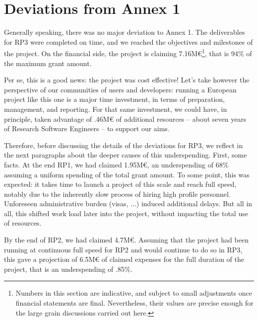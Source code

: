 \section{Deviations from Annex 1}
\label{section.deviations}

Generally speaking, there was no major deviation to Annex 1. The
deliverables for RP3 were completed on time, and we reached the
objectives and milestones of the project. On the financial side, the
project is claiming 7.16M€\footnote{Numbers in this section are
  indicative, and subject to small adjustments once financial
  statements are final. Nevertheless, their values are precise enough
  for the large grain discussions carried out here.}, that is 94\% of
the maximum grant amount.

Per se, this is a good news: the project was cost effective! Let's
take however the perspective of our communities of users and
developers: running a European project like this one is a major time
investment, in terms of preparation, management, and reporting. For
that same investment, we could have, in principle, taken advantage of
.46M€ of additional resources -- about seven years of Research
Software Engineers -- to support our aims.

Therefore, before discussing the details of the deviations for RP3, we
reflect in the next paragraphs about the deeper causes of this
underspending. First, some facts. At the end RP1, we had claimed
1.95M€, an underspending of 68\% assuming a uniform spending of the
total grant amount. To some point, this was expected: it takes time to
launch a project of this scale and reach full speed, notably due to
the inherently slow process of hiring high profile personnel.
Unforeseen administrative burden (visas, ...) induced additional
delays. But all in all, this shifted work load later into the project,
without impacting the total use of resources.

By the end of RP2, we had claimed 4.7M€. Assuming that the project had
been running at continuous full speed for RP2 and would continue to do
so in RP3, this gave a projection of 6.5M€ of claimed expenses for the
full duration of the project, that is an underspending of .85\%.


